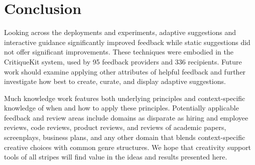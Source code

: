 \section{Conclusion}
Looking across the deployments and experiments, adaptive suggestions and interactive guidance significantly improved feedback while static suggestions did not offer significant improvements. These techniques were embodied in the CritiqueKit system, used by 95 feedback providers and 336 recipients. Future work should examine applying other attributes of helpful feedback and further investigate how best to create, curate, and display adaptive suggestions. 

Much knowledge work features both underlying principles and context-specific knowledge of when and how to apply these principles. Potentially applicable feedback and review areas include domains as disparate as hiring and employee reviews, code reviews, product reviews, and reviews of academic papers, screenplays, business plans, and any other domain that blends context-specific creative choices with common genre structures. We hope that creativity support tools of all stripes will find value in the ideas and results presented here.
